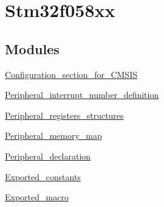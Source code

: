 \hypertarget{group__stm32f058xx}{}\section{Stm32f058xx}
\label{group__stm32f058xx}
\subsection*{Modules}
\begin{DoxyCompactItemize}
\item 
\hyperlink{group___configuration__section__for___c_m_s_i_s}{Configuration\+\_\+section\+\_\+for\+\_\+\+C\+M\+S\+IS}
\item 
\hyperlink{group___peripheral__interrupt__number__definition}{Peripheral\+\_\+interrupt\+\_\+number\+\_\+definition}
\item 
\hyperlink{group___peripheral__registers__structures}{Peripheral\+\_\+registers\+\_\+structures}
\item 
\hyperlink{group___peripheral__memory__map}{Peripheral\+\_\+memory\+\_\+map}
\item 
\hyperlink{group___peripheral__declaration}{Peripheral\+\_\+declaration}
\item 
\hyperlink{group___exported__constants}{Exported\+\_\+constants}
\item 
\hyperlink{group___exported__macro}{Exported\+\_\+macro}
\end{DoxyCompactItemize}

